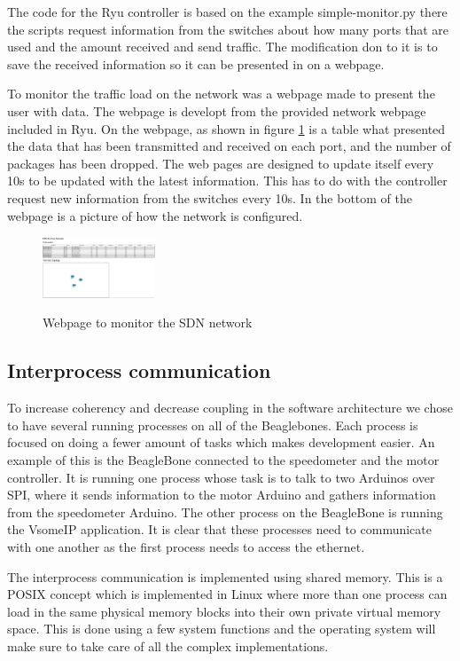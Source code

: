 \documentclass[11pt, titlepage]{article} %
\begin{document}
The code for the Ryu controller is based on the example simple-monitor.py there the scripts request information from the switches about how many ports that are used and the amount received and send traffic. The modification don to it is to save the received information so it can be presented in on a webpage.

To monitor the traffic load on the network was a webpage made to present the user with data. The webpage is developt from the provided network webpage included in Ryu. On the webpage, as shown in figure \ref{fig:webpage_sdn} is a table what presented the data that has been transmitted and received on each port, and the number of packages has been dropped. The web pages are designed to update itself every 10s to be updated with the latest information.  This has to do with the controller request new information from the switches every 10s.  In the bottom of the webpage is a picture of how the network is configured. 

\begin{figure}
	\includegraphics[width=0.3\textwidth]{webpage.PNG}
	\label{fig:webpage_sdn}
	\caption{Webpage to monitor the SDN network}
\end{figure}


\subsection{Interprocess communication}
To increase coherency and decrease coupling in the software architecture we chose to have several running processes on all of the Beaglebones. Each process is focused on doing a fewer amount of tasks which makes development easier. An example of this is the BeagleBone connected to the speedometer and the motor controller. It is running one process whose task is to talk to two Arduinos over SPI, where it sends information to the motor Arduino and gathers information from the speedometer Arduino. The other process on the BeagleBone is running the VsomeIP application. It is clear that these processes need to communicate with one another as the first process needs to access the ethernet.

The interprocess communication is implemented using shared memory. This is a POSIX concept which is implemented in Linux where more than one process can load in the same physical memory blocks into their own private virtual memory space. This is done using a few system functions and the operating system will make sure to take care of all the complex implementations.
\end{document}
